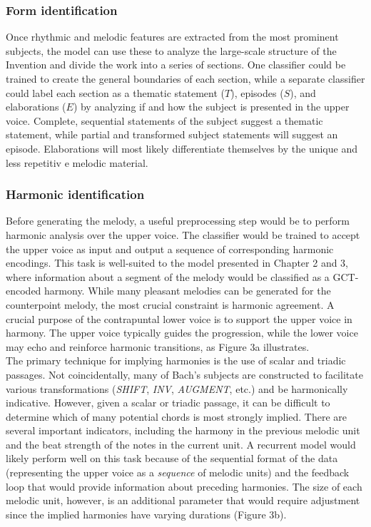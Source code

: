 \documentclass[11pt]{book}
\begin{document}
\subsubsection{Form identification}
Once rhythmic and melodic features are extracted from the most prominent subjects, the model can use these to analyze the large-scale structure of the Invention and divide the work into a series of sections. One classifier could be trained to create the general boundaries of each section, while a separate classifier could label each section as a thematic statement ($T$), episodes ($S$), and elaborations ($E$) by analyzing if and how the subject is presented in the upper voice. Complete, sequential statements of the subject suggest a thematic statement, while partial and transformed subject statements will suggest an episode. Elaborations will most likely differentiate themselves by the unique and less repetitiv e melodic material.

\subsubsection{Harmonic identification}
Before generating the melody, a useful preprocessing step would be to perform harmonic analysis over the upper voice. The classifier would be trained to accept the upper voice as input and output a sequence of corresponding harmonic encodings. This task is well-suited to the model presented in Chapter 2 and 3, where information about a segment of the melody would be classified as a GCT-encoded harmony. While many pleasant melodies can be generated for the counterpoint melody, the most crucial constraint is harmonic agreement. A crucial purpose of the contrapuntal lower voice is to support the upper voice in harmony. The upper voice typically guides the progression, while the lower voice may echo and reinforce harmonic transitions, as Figure 3a illustrates. \\

The primary technique for implying harmonies is the use of scalar and triadic passages. Not coincidentally, many of Bach's subjects are constructed to facilitate various transformations (\textit{SHIFT}, \textit{INV}, \textit{AUGMENT}, etc.) and be harmonically indicative. However, given a scalar or triadic passage, it can be difficult to determine which of many potential chords is most strongly implied. There are several important indicators, including the harmony in the previous melodic unit and the beat strength of the notes in the current unit. A recurrent model would likely perform well on this task because of the sequential format of the data (representing the upper voice as a \textit{sequence} of melodic units) and the feedback loop that would provide information about preceding harmonies. The size of each melodic unit, however, is an additional parameter that would require adjustment since the implied harmonies have varying durations (Figure 3b). \\
\end{document}
